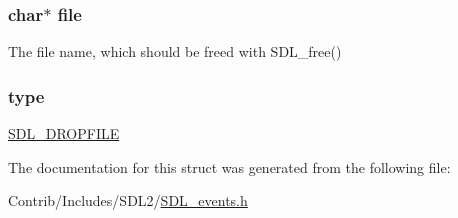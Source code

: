 \subsubsection[{\texorpdfstring{file}{file}}]{\setlength{\rightskip}{0pt plus 5cm}char$\ast$ file}\hypertarget{struct_s_d_l___drop_event_adf16cd437526a5c5e0e0af87745acbb8}{}\label{struct_s_d_l___drop_event_adf16cd437526a5c5e0e0af87745acbb8}
The file name, which should be freed with S\+D\+L\+\_\+free() 
\subsubsection[{\texorpdfstring{type}{type}}]{ type}\hypertarget{struct_s_d_l___drop_event_aa40a9b05c3154032b9f2d7220e9f08dc}{}\label{struct_s_d_l___drop_event_aa40a9b05c3154032b9f2d7220e9f08dc}
\hyperlink{_s_d_l__events_8h_a3b589e89be6b35c02e0dd34a55f3fccaad9238862d7aeaebff88be6453ee0fbab}{S\+D\+L\+\_\+\+D\+R\+O\+P\+F\+I\+LE} 

The documentation for this struct was generated from the following file\+:\begin{DoxyCompactItemize}
\item 
Contrib/\+Includes/\+S\+D\+L2/\hyperlink{_s_d_l__events_8h}{S\+D\+L\+\_\+events.\+h}\end{DoxyCompactItemize}

